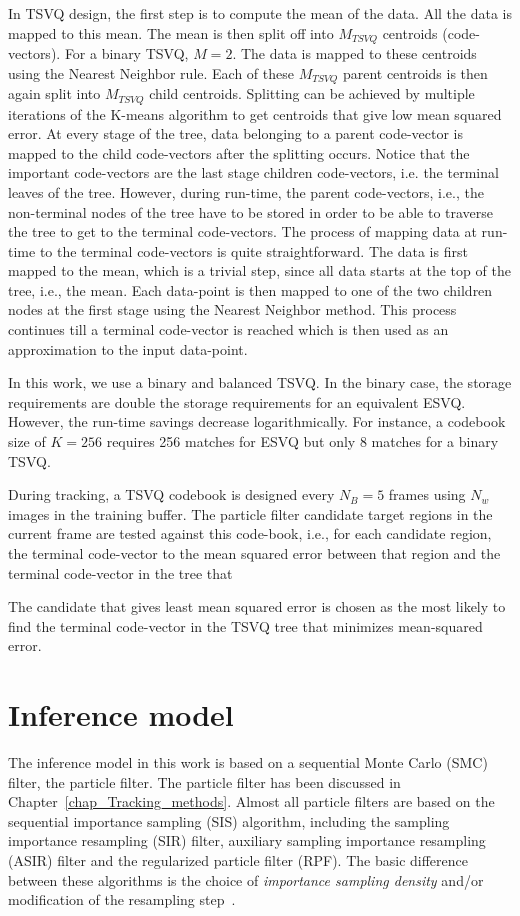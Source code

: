 In TSVQ design, the first step is to compute the mean of the data.  All the data is mapped to this mean.  The mean is then split off into $M_{TSVQ}$ centroids (code-vectors).  For a binary TSVQ, $M=2$.  The data is mapped to these centroids using the Nearest Neighbor rule.  Each of these $M_{TSVQ}$ parent centroids is then again split into $M_{TSVQ}$ child centroids.  Splitting can be achieved by multiple iterations of the K-means algorithm to get centroids that give low mean squared error.  At every stage of the tree, data belonging to a parent code-vector is mapped to the child code-vectors after the splitting occurs.  Notice that the important code-vectors are the last stage children code-vectors, i.e. the terminal leaves of the tree.  However, during run-time, the parent code-vectors, i.e., the non-terminal nodes of the tree have to be stored in order to be able to traverse the tree to get to the terminal code-vectors.  The process of mapping data at run-time to the terminal code-vectors is quite straightforward.  The data is first mapped to the mean, which is a trivial step, since all data starts at the top of the tree, i.e., the mean.  Each data-point is then mapped to one of the two children nodes at the first stage using the Nearest Neighbor method.  This process continues till a terminal code-vector is reached which is then used as an approximation to the input data-point.

In this work, we use a binary and balanced TSVQ.  In the binary case, the storage requirements are double the storage requirements for an equivalent ESVQ.  However, the run-time savings decrease logarithmically.  For instance, a codebook size of $K=256$ requires 256 matches for ESVQ but only 8 matches for a binary TSVQ.  

During tracking, a TSVQ codebook is designed every $N_B=5$ frames using $N_w$ images in the training buffer.  The particle filter candidate target regions in the current frame are tested against this code-book, i.e., for each candidate region, the terminal code-vector  to the mean squared error between that region and the terminal code-vector in the tree that 

The candidate that gives least mean squared error is chosen as the most likely  to find the terminal code-vector in the TSVQ tree that minimizes mean-squared error.  

\section{Inference model}
The inference model in this work is based on a sequential Monte Carlo (SMC) filter, the particle filter.  The particle filter has been discussed in Chapter~\ref{chap_Tracking_methods}.  Almost all particle filters are based on the sequential importance sampling (SIS) algorithm, including the sampling importance resampling (SIR) filter, auxiliary sampling importance resampling (ASIR) filter and the regularized particle filter (RPF).  The basic difference between these algorithms is the choice of \emph{importance sampling density} and/or modification of the resampling step~\cite{2002_JNL_PF_Arulampalam}.  

